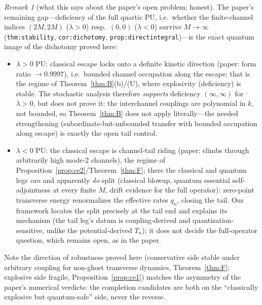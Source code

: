 \documentclass[11pt]{article}
\theoremstyle{remark}
\newtheorem{remark}[theorem]{Remark}
\begin{document}
\begin{remark}[what this says about the paper's open problem; honest]
The paper's remaining gap---deficiency of the full quartic PU, i.e.\
whether the finite-channel indices $(2M,2M)$ ($\lambda>0$) resp.\
$(0,0)$ ($\lambda<0$) survive $M\to\infty$
(\texttt{thm:stability}, \texttt{cor:dichotomy},
\texttt{prop:directintegral})---is the exact quantum image of the
dichotomy proved here:
\begin{itemize}
\item $\lambda>0$ PU: classical escape locks onto a definite kinetic
direction (paper: form ratio $\to0.9997$), i.e.\ bounded channel
occupation along the escape; that is the regime of
Theorem~\ref{thm:B}(b)/(U), where explosivity (deficiency) is stable.
The stochastic analysis therefore \emph{supports} deficiency
$(\infty,\infty)$ for $\lambda>0$, but does not prove it: the
interchannel couplings are polynomial in $k$, not bounded, so
Theorem~\ref{thm:B} does not apply literally---the needed strengthening
(subordinate-but-unbounded transfer with bounded occupation along
escape) is exactly the open tail control.
\item $\lambda<0$ PU: the classical escape is channel-tail riding
(paper: climbs through arbitrarily high mode-2 channels), the regime of
Proposition~\ref{prop:ce2}/Theorem~\ref{thm:F}; there the classical and
quantum legs \emph{can} and apparently \emph{do} split (classical
blowup, quantum essential self-adjointness at every finite $M$, drift
evidence for the full operator): zero-point transverse energy
renormalizes the effective rates $q_{n}$, closing the tail.  Our
framework locates the split precisely at the tail end and explains its
mechanism (the tail leg's datum is coupling-derived and
quantization-sensitive, unlike the potential-derived $T_{n}$); it does
not decide the full-operator question, which remains open, as in the
paper.
\end{itemize}
Note the direction of robustness proved here (conservative side stable
under arbitrary coupling for non-ghost transverse dynamics,
Theorem~\ref{thm:F}; explosive side fragile, Proposition~\ref{prop:ce1})
matches the asymmetry of the paper's numerical verdicts: the
completion candidates are both on the ``classically explosive but
quantum-safe'' side, never the reverse.
\end{remark}
\end{document}
